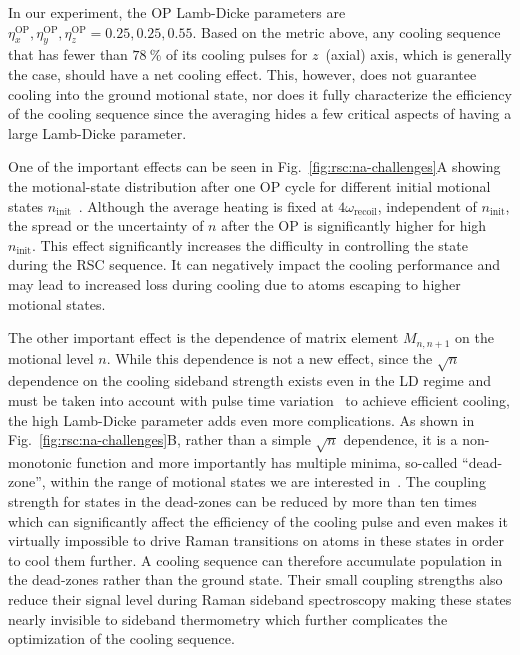 In our experiment, the OP Lamb-Dicke parameters are
$\eta^{\mathrm{OP}}_x, \eta^{\mathrm{OP}}_y, \eta^{\mathrm{OP}}_z = 0.25, 0.25, 0.55$.
Based on the metric above, any cooling sequence
that has fewer than $78~\mathrm{\%}$ of its cooling pulses for $z$~(axial) axis,
which is generally the case, should have a net cooling effect.
This, however, does not guarantee cooling into the ground motional state,
nor does it fully characterize the efficiency of the cooling sequence
since the averaging hides a few critical aspects of having a large Lamb-Dicke parameter.

One of the important effects can be seen in Fig.~\ref{fig:rsc:na-challenges}A showing
the motional-state distribution after one OP cycle
for different initial motional states $n_{\mathrm{init}}$~\cite{wineland_laser_1979}.
Although the average heating is fixed at $4\omega_{\mathrm{recoil}}$,
independent of $n_{\mathrm{init}}$,
the spread or the uncertainty of $n$ after the OP is significantly
higher for high $n_{\mathrm{init}}$.
This effect significantly increases the difficulty in controlling the state during the
RSC sequence. It can negatively impact the cooling performance and
may lead to increased loss during cooling due to atoms escaping to higher motional states.

The other important effect is the dependence of matrix element $M_{n,n+1}$
on the motional level $n$.
While this dependence is not a new effect, since the $\sqrt{n}$ dependence
on the cooling sideband strength exists even in the LD regime
and must be taken into account with
pulse time variation~\cite{wineland_experimental_1998,liu_molecular_2019}
to achieve efficient cooling, the high Lamb-Dicke parameter adds even more complications.
As shown in Fig.~\ref{fig:rsc:na-challenges}B, rather than a simple $\sqrt{n}$ dependence,
it is a non-monotonic function and more importantly has multiple minima, so-called ``dead-zone'',
within the range of motional states we are interested in~\cite{wineland_laser_1979}.
The coupling strength for states in the dead-zones can be reduced by more than ten times
which can significantly affect the efficiency of the cooling pulse
and even makes it virtually impossible to drive Raman transitions on atoms in these states
in order to cool them further.
A cooling sequence can therefore accumulate population in the dead-zones
rather than the ground state.
Their small coupling strengths also reduce their signal level during
Raman sideband spectroscopy making these states nearly invisible to sideband thermometry
which further complicates the optimization of the cooling sequence.

